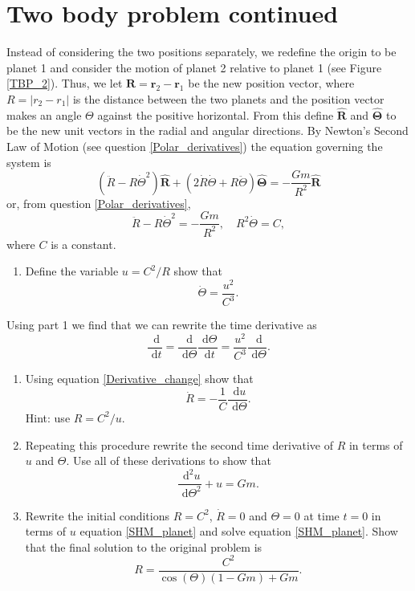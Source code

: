 \documentclass[]{article}
\newcounter{ItemCounter}
\newcommand{\bb}{\begin{equation}}
\newcommand{\ee}{\end{equation}}
\newcommand{\rd}{\text{ d}}
\newcommand{\see}[1]{(see Figure \ref{#1})}
\newcommand{\eqn}[1]{equation \eqref{#1}}
\renewcommand{\l}{\left(}
\renewcommand{\r}{\right)}
\begin{document}
\section{Two body problem continued}\label{Two body problem continued}
Instead of considering the two positions separately, we redefine the origin to be planet 1 and consider the motion of planet 2 relative to planet 1 \see{TBP_2}. Thus, we let $\bm{R}=\bm{r}_2-\bm{r}_1$ be the new position vector, where $R=|r_2-r_1|$ is the distance between the two planets and the position vector makes an angle $\Theta$ against the positive horizontal. From this define $\hat{\bm{R}}$ and $\hat{\bm{\Theta}}$ to be the new unit vectors in the radial and angular directions. By Newton's Second Law of Motion (see question \ref{Polar_derivatives}) the equation governing the system is
\bb
\l \ddot{R}-R\dot{\Theta}^2\r\hat{\bm{R}}+\l 2\dot{R}\dot{\Theta}+R\ddot{\Theta}\r\hat{\bm{\Theta}}=-\frac{Gm}{R^2}\hat{\bm{R}}
\ee
or, from question \ref{Polar_derivatives},
\bb
\ddot{R}-R\dot{\Theta}^2=-\frac{Gm}{R^2},\quad R^2\dot{\Theta}=C,
\ee
where $C$ is a constant.
\begin{enumerate}
\item Define the variable $u=C^2/R$ show that
\bb
\dot{\Theta}=\frac{u^2}{C^3}.
\ee
\setcounter{ItemCounter}{\value{enumi}}
\end{enumerate}
\noindent Using part 1 we find that we can rewrite the time derivative as
\bb
\frac{\rd }{\rd t}=\frac{\rd }{\rd \Theta}\frac{\rd \Theta}{\rd t}=\frac{u^2}{C^3}\frac{\rd }{\rd \Theta}.\label{Derivative_change}
\ee
\begin{enumerate}
\setcounter{enumi}{\value{ItemCounter}}
\item Using \eqn{Derivative_change} show that
\bb
\dot{R}=-\frac{1}{C}\frac{\rd u}{\rd \Theta}.
\ee
Hint: use $R= C^2/u$.
\item Repeating this procedure rewrite the second time derivative of $R$ in terms of $u$ and $\Theta$. Use all of these derivations to show that
\bb
\frac{\rd^2 u}{\rd \Theta^2}+u=Gm.\label{SHM_planet}
\ee
\item Rewrite the initial conditions $R=C^2$, $\dot{R}=0$ and $\Theta=0$ at time $t=0$ in terms of $u$ \eqn{SHM_planet} and solve \eqn{SHM_planet}. Show that the final solution to the original problem is
\bb
R=\frac{C^2}{\cos(\Theta)(1-Gm)+Gm}.
\ee
\end{enumerate}
\end{document}

